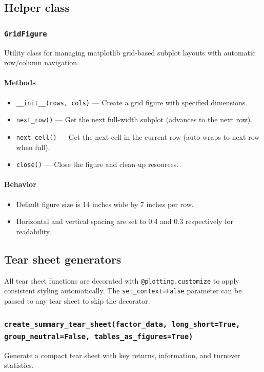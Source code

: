\documentclass[11pt]{article}
\begin{document}
\subsection{Helper class}

\subsubsection{\texttt{GridFigure}}
Utility class for managing matplotlib grid-based subplot layouts with automatic row/column navigation.

\paragraph{Methods}
\begin{itemize}
  \item \texttt{\_\_init\_\_(rows, cols)} --- Create a grid figure with specified dimensions.
  \item \texttt{next\_row()} --- Get the next full-width subplot (advances to the next row).
  \item \texttt{next\_cell()} --- Get the next cell in the current row (auto-wraps to next row when full).
  \item \texttt{close()} --- Close the figure and clean up resources.
\end{itemize}

\paragraph{Behavior}
\begin{itemize}
  \item Default figure size is 14 inches wide by 7 inches per row.
  \item Horizontal and vertical spacing are set to 0.4 and 0.3 respectively for readability.
\end{itemize}

\subsection{Tear sheet generators}

All tear sheet functions are decorated with \texttt{@plotting.customize} to apply consistent styling automatically. The \texttt{set\_context=False} parameter can be passed to any tear sheet to skip the decorator.

\subsubsection{\texttt{create\_summary\_tear\_sheet(factor\_data, long\_short=True, group\_neutral=False, tables\_as\_figures=True)}}
Generate a compact tear sheet with key returns, information, and turnover statistics.
\end{document}
